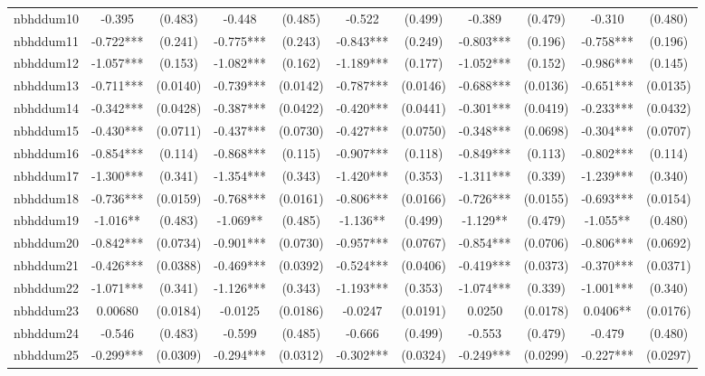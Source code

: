 \documentclass[]{article}
\begin{document}
\begin{tabular}{lcccccccccc}
nbhddum10 & -0.395 & (0.483) & -0.448 & (0.485) & -0.522 & (0.499) & -0.389 & (0.479) & -0.310 & (0.480) \\
nbhddum11 & -0.722*** & (0.241) & -0.775*** & (0.243) & -0.843*** & (0.249) & -0.803*** & (0.196) & -0.758*** & (0.196) \\
nbhddum12 & -1.057*** & (0.153) & -1.082*** & (0.162) & -1.189*** & (0.177) & -1.052*** & (0.152) & -0.986*** & (0.145) \\
nbhddum13 & -0.711*** & (0.0140) & -0.739*** & (0.0142) & -0.787*** & (0.0146) & -0.688*** & (0.0136) & -0.651*** & (0.0135) \\
nbhddum14 & -0.342*** & (0.0428) & -0.387*** & (0.0422) & -0.420*** & (0.0441) & -0.301*** & (0.0419) & -0.233*** & (0.0432) \\
nbhddum15 & -0.430*** & (0.0711) & -0.437*** & (0.0730) & -0.427*** & (0.0750) & -0.348*** & (0.0698) & -0.304*** & (0.0707) \\
nbhddum16 & -0.854*** & (0.114) & -0.868*** & (0.115) & -0.907*** & (0.118) & -0.849*** & (0.113) & -0.802*** & (0.114) \\
nbhddum17 & -1.300*** & (0.341) & -1.354*** & (0.343) & -1.420*** & (0.353) & -1.311*** & (0.339) & -1.239*** & (0.340) \\
nbhddum18 & -0.736*** & (0.0159) & -0.768*** & (0.0161) & -0.806*** & (0.0166) & -0.726*** & (0.0155) & -0.693*** & (0.0154) \\
nbhddum19 & -1.016** & (0.483) & -1.069** & (0.485) & -1.136** & (0.499) & -1.129** & (0.479) & -1.055** & (0.480) \\
nbhddum20 & -0.842*** & (0.0734) & -0.901*** & (0.0730) & -0.957*** & (0.0767) & -0.854*** & (0.0706) & -0.806*** & (0.0692) \\
nbhddum21 & -0.426*** & (0.0388) & -0.469*** & (0.0392) & -0.524*** & (0.0406) & -0.419*** & (0.0373) & -0.370*** & (0.0371) \\
nbhddum22 & -1.071*** & (0.341) & -1.126*** & (0.343) & -1.193*** & (0.353) & -1.074*** & (0.339) & -1.001*** & (0.340) \\
nbhddum23 & 0.00680 & (0.0184) & -0.0125 & (0.0186) & -0.0247 & (0.0191) & 0.0250 & (0.0178) & 0.0406** & (0.0176) \\
nbhddum24 & -0.546 & (0.483) & -0.599 & (0.485) & -0.666 & (0.499) & -0.553 & (0.479) & -0.479 & (0.480) \\
nbhddum25 & -0.299*** & (0.0309) & -0.294*** & (0.0312) & -0.302*** & (0.0324) & -0.249*** & (0.0299) & -0.227*** & (0.0297) \\

\end{tabular}
\end{document}
